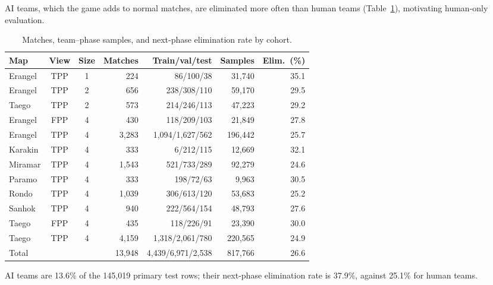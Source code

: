 \documentclass[sigconf,anonymous,nonacm]{acmart}
\begin{document}
AI teams, which the game adds to normal matches, are eliminated more often than human teams (Table~\ref{tab:cohorts}), motivating human-only evaluation.

\begin{table}[t]
\centering
\caption{Matches, team--phase samples, and next-phase elimination rate by cohort.}
\label{tab:cohorts}
\footnotesize
\setlength{\tabcolsep}{2.7pt}
\begin{tabular}{lccrrrr}
\hline
Map & View & Size & Matches & Train/val/test & Samples & Elim.\ (\%) \\
\hline
Erangel & TPP & 1 & 224 & 86/100/38 & 31,740 & 35.1 \\
Erangel & TPP & 2 & 656 & 238/308/110 & 59,170 & 29.5 \\
Taego & TPP & 2 & 573 & 214/246/113 & 47,223 & 29.2 \\
Erangel & FPP & 4 & 430 & 118/209/103 & 21,849 & 27.8 \\
Erangel & TPP & 4 & 3,283 & 1,094/1,627/562 & 196,442 & 25.7 \\
Karakin & TPP & 4 & 333 & 6/212/115 & 12,669 & 32.1 \\
Miramar & TPP & 4 & 1,543 & 521/733/289 & 92,279 & 24.6 \\
Paramo & TPP & 4 & 333 & 198/72/63 & 9,963 & 30.5 \\
Rondo & TPP & 4 & 1,039 & 306/613/120 & 53,683 & 25.2 \\
Sanhok & TPP & 4 & 940 & 222/564/154 & 48,793 & 27.6 \\
Taego & FPP & 4 & 435 & 118/226/91 & 23,390 & 30.0 \\
Taego & TPP & 4 & 4,159 & 1,318/2,061/780 & 220,565 & 24.9 \\
\hline
Total & & & 13,948 & 4,439/6,971/2,538 & 817,766 & 26.6 \\
\hline
\end{tabular}
\smallskip
\parbox{\columnwidth}{\scriptsize AI teams are 13.6\% of the 145,019 primary test rows; their next-phase elimination rate is 37.9\%, against 25.1\% for human teams.}
\end{table}
\end{document}
